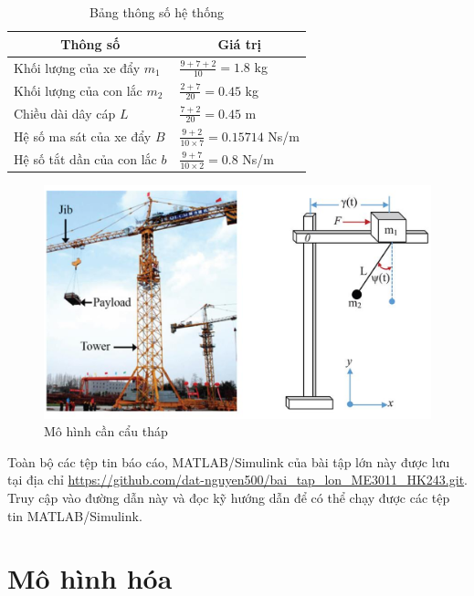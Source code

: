 \documentclass[12pt,a4paper]{article}
\begin{document}
\begin{table}[ht]
    \centering
    \begin{tabular}{|l|l|}
        \hline
        \multicolumn{1}{|c|}{\textbf{Thông số}} & \multicolumn{1}{c|}{\textbf{Giá trị}} \\ \hline
        \rule{0pt}{7mm}Khối lượng của xe đẩy $m_1$ & $\frac{9+7+2}{10} = 1.8$ kg\\[3mm] \hline
        \rule{0pt}{7mm}Khối lượng của con lắc $m_2$ & $\frac{2+7}{20} = 0.45$ kg \\[3mm] \hline
        \rule{0pt}{7mm}Chiều dài dây cáp $L$ & $\frac{7+2}{20} = 0.45$ m \\[3mm] \hline
        \rule{0pt}{7mm}Hệ số ma sát của xe đẩy $B$ &  $\frac{9+2}{10\times 7} =0.15714 $ Ns/m\\[3mm] \hline
        \rule{0pt}{7mm}Hệ số tắt dần của con lắc $b$ & $\frac{9+7}{10\times 2} = 0.8$ Ns/m \\[3mm] \hline 
    \end{tabular}
    \caption{Bảng thông số hệ thống}
    \label{table:1}
\end{table}

\begin{figure}[ht]
    \centering
    \includegraphics[width=\textwidth]{crane.png}
    \caption{Mô hình cần cẩu tháp}
\end{figure}

Toàn bộ các tệp tin báo cáo, MATLAB/Simulink của bài tập lớn này được lưu tại địa chỉ \url{https://github.com/dat-nguyen500/bai_tap_lon_ME3011_HK243.git}. Truy cập vào đường dẫn này và đọc kỹ hướng dẫn để có thể chạy được các tệp tin MATLAB/Simulink.

\newpage
\section{Mô hình hóa}
\end{document}

